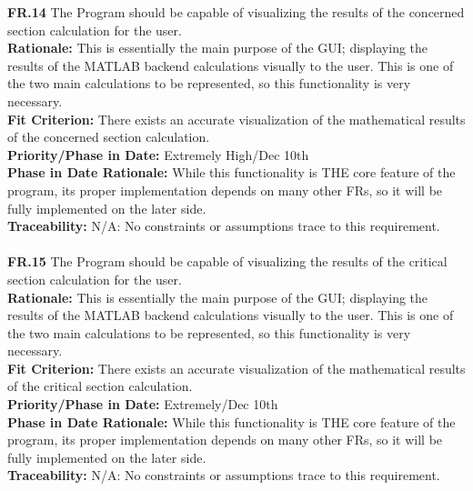\documentclass[12pt]{article}
\begin{document}
  \noindent\textbf{FR.14} The Program should be capable of visualizing the results of the concerned section calculation for the user.\\
  \textbf{Rationale:} This is essentially the main purpose of the GUI; displaying the results of the MATLAB backend calculations visually to the user. This is one of the two
  main calculations to be represented, so this functionality is very necessary.\\
  \textbf{Fit Criterion:} There exists an accurate visualization of the mathematical results of the concerned section calculation.\\
  \textbf{Priority/Phase in Date:} Extremely High/Dec 10th\\
  \textbf{Phase in Date Rationale:} While this functionality is THE core feature of the program, its proper implementation depends on many other FRs, so it will be fully implemented on the later side.\\
  \textbf{Traceability:} N/A: No constraints or assumptions trace to this requirement.\\\\

  \noindent\textbf{FR.15} The Program should be capable of visualizing the results of the critical section calculation for the user.\\
  \textbf{Rationale:} This is essentially the main purpose of the GUI; displaying the results of the MATLAB backend calculations visually to the user. This is one of the two
  main calculations to be represented, so this functionality is very necessary.\\
  \textbf{Fit Criterion:} There exists an accurate visualization of the mathematical results of the critical section calculation.\\
  \textbf{Priority/Phase in Date:} Extremely/Dec 10th\\
  \textbf{Phase in Date Rationale:} While this functionality is THE core feature of the program, its proper implementation depends on many other FRs, so it will be fully implemented on the later side.\\
  \textbf{Traceability:} N/A: No constraints or assumptions trace to this requirement.\\\\
\end{document}
